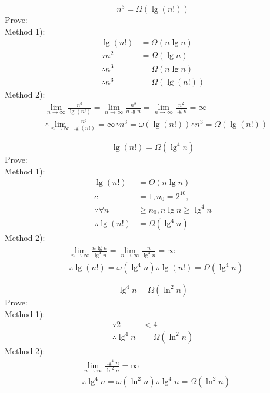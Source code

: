 \documentclass[12pt,letterpaper]{article}
\begin{document}
\begin{enumerate}
$$n^3 = \Omega (\lg (n!))$$
Prove: \\
Method 1):
\begin{align*}
\lg (n!) &= \Theta(n \lg n) \\
\because n^2 &= \Omega(\lg n) \\
\therefore n^3 &=\Omega(n \lg n) \\
\therefore n^3 &= \Omega(\lg (n!))
\end{align*}
Method 2):
\begin{align*}
& \lim_{n \to \infty} \frac{n^3}{\lg (n!)} = \lim_{n \to \infty} \frac{n^3}{n \lg n} = \lim_{n \to \infty} \frac{n^2}{\lg n} = \infty \\
& \therefore \lim_{n \to \infty} \frac{n^3}{\lg (n!)} = \infty \therefore n^3 = \omega(\lg (n!)) \therefore n^3 = \Omega(\lg (n!))
\end{align*}

$$\lg (n!) = \Omega (\lg ^4 n)$$
Prove: \\
Method 1):
\begin{align*}
\lg (n!) &= \Theta(n \lg n) \\
c &= 1, n_0 = 2 ^ 10, \\
\because \forall n& \ge n_0, n \lg n \ge \lg ^4 n \\
\therefore \lg (n!) &= \Omega (\lg ^4 n)
\end{align*}
Method 2):
\begin{align*}
& \lim_{n \to \infty} \frac{n \lg n}{\lg ^4 n} = \lim_{n \to \infty} \frac{n}{\lg ^ 3 n} = \infty \\
& \therefore \lg (n!) = \omega(\lg ^ 4 n) \therefore \lg (n!) = \Omega(\lg ^ 4 n)
\end{align*}

$$\lg ^4 n = \Omega(\ln ^2 n)$$
Prove: \\
Method 1):
\begin{align*}
\because 2 &< 4 \\
\therefore \lg ^4 n &= \Omega(\ln ^2 n)
\end{align*}
Method 2):
\begin{align*}
& \lim_{n \to \infty} \frac{\lg ^4 n}{\ln ^2 n} = \infty \\
&\therefore \lg ^ 4 n = \omega (\ln ^ 2 n) \therefore \lg ^ 4 n = \Omega(\ln ^2 n)
\end{align*}


\end{enumerate}
\end{document}
